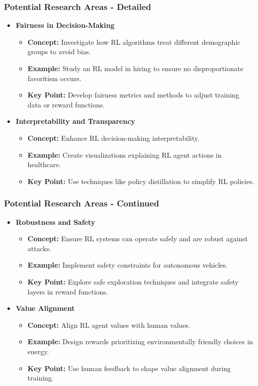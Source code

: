 \documentclass[aspectratio=169]{beamer}
\begin{document}
\begin{frame}[fragile]
  \frametitle{Potential Research Areas - Detailed}
  
  \begin{itemize}
    \item \textbf{Fairness in Decision-Making}
      \begin{itemize}
        \item \textbf{Concept:} Investigate how RL algorithms treat different demographic groups to avoid bias.
        \item \textbf{Example:} Study an RL model in hiring to ensure no disproportionate favoritism occurs.
        \item \textbf{Key Point:} Develop fairness metrics and methods to adjust training data or reward functions.
      \end{itemize}
      
    \item \textbf{Interpretability and Transparency}
      \begin{itemize}
        \item \textbf{Concept:} Enhance RL decision-making interpretability.
        \item \textbf{Example:} Create visualizations explaining RL agent actions in healthcare.
        \item \textbf{Key Point:} Use techniques like policy distillation to simplify RL policies.
      \end{itemize}
  \end{itemize}
\end{frame}

\begin{frame}[fragile]
  \frametitle{Potential Research Areas - Continued}
  
  \begin{itemize}
    \item \textbf{Robustness and Safety}
      \begin{itemize}
        \item \textbf{Concept:} Ensure RL systems can operate safely and are robust against attacks.
        \item \textbf{Example:} Implement safety constraints for autonomous vehicles.
        \item \textbf{Key Point:} Explore safe exploration techniques and integrate safety layers in reward functions.
      \end{itemize}
      
    \item \textbf{Value Alignment}
      \begin{itemize}
        \item \textbf{Concept:} Align RL agent values with human values.
        \item \textbf{Example:} Design rewards prioritizing environmentally friendly choices in energy.
        \item \textbf{Key Point:} Use human feedback to shape value alignment during training.
      \end{itemize}
  \end{itemize}
\end{frame}
\end{document}
